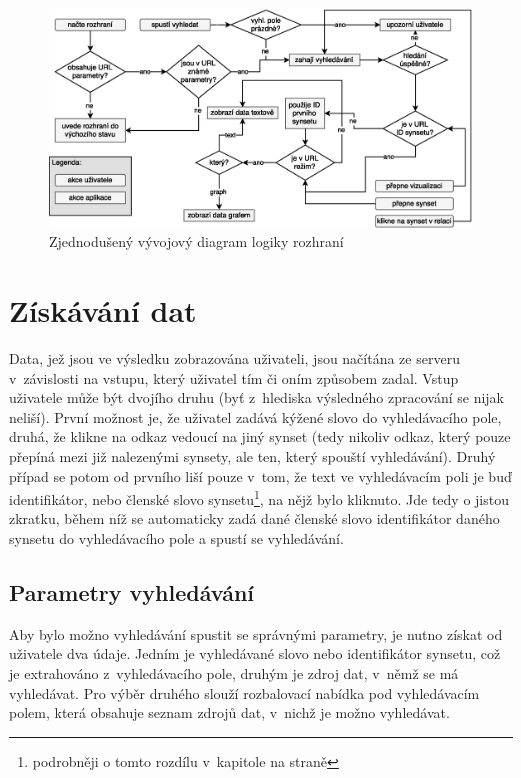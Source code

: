 \documentclass[a4paper, 11pt, oneside, showtrims]{book}
\newcommand{\itNameRef}[1]{\textit{\nameref{#1}}}
\begin{document}
			\begin{figure}[h]
				\centering
				\includegraphics[width=1.0\textwidth]{wordnet-ui-diag_v2.eps}
				\caption{Zjednodušený vývojový diagram logiky rozhraní}
				\label{fig:wordnet-ui-diag}
			\end{figure}

			\section{Získávání dat}
				
				Data, jež jsou ve výsledku zobrazována uživateli, jsou načítána ze serveru v~závislosti na vstupu, který uživatel tím či oním způsobem zadal. Vstup uživatele může být dvojího druhu (byť z~hlediska výsledného zpracování se nijak neliší). První možnost je, že uživatel zadává kýžené slovo do vyhledávacího pole, druhá, že klikne na odkaz vedoucí na jiný synset (tedy nikoliv odkaz, který pouze přepíná mezi již nalezenými synsety, ale ten, který spouští vyhledávání). Druhý případ se potom od prvního liší pouze v~tom, že text ve vyhledávacím poli je buď identifikátor, nebo členské slovo synsetu\footnote{podrobněji o tomto rozdílu v~kapitole \itNameRef{cha:textovarepres} na straně \pageref{cha:textovarepres}}, na nějž bylo kliknuto. Jde tedy o jistou zkratku, během níž se automaticky zadá dané členské slovo identifikátor daného synsetu do vyhledávacího pole a spustí se vyhledávání.

				\subsection{Parametry vyhledávání}
				
					Aby bylo možno vyhledávání spustit se správnými parametry, je nutno získat od uživatele dva údaje. Jedním je vyhledávané slovo nebo identifikátor synsetu, což je extrahováno z~vyhledávacího pole, druhým je zdroj dat, v~němž se má vyhledávat. Pro výběr druhého slouží rozbalovací nabídka pod vyhledávacím polem, která obsahuje seznam zdrojů dat, v~nichž je možno vyhledávat.
\end{document}
